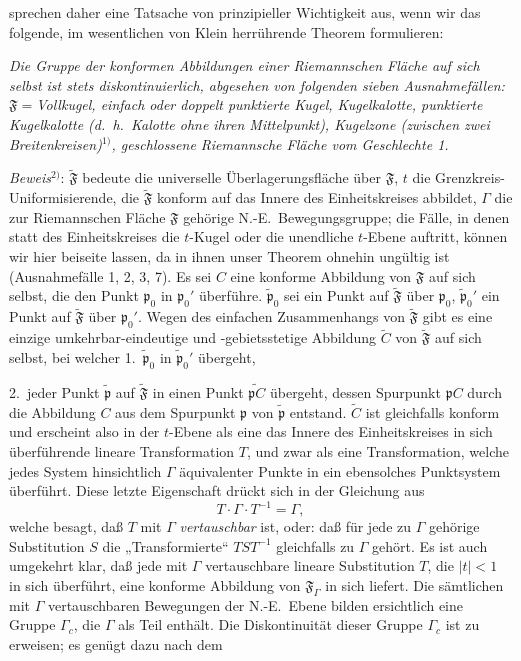 \documentclass{article}
\begin{document}
sprechen daher eine Tatsache von prinzipieller Wichtigkeit aus, wenn wir das folgende, im wesentlichen von Klein herrührende Theorem formulieren:

\emph{Die Gruppe der konformen Abbildungen einer Riemannschen Fläche auf sich selbst ist stets diskontinuierlich, abgesehen von folgenden sieben Ausnahmefällen: $\mathfrak{F} = {}$Vollkugel, einfach oder doppelt punktierte Kugel, Kugelkalotte, punktierte Kugelkalotte (d.~h.\ Kalotte ohne ihren Mittelpunkt), Kugelzone (zwischen zwei Breitenkreisen)${}^{1)}$, geschlossene Riemannsche Fläche vom Geschlechte 1.}

\emph{Beweis}${}^{2)}$: $\widetilde{\mathfrak{F}}$ bedeute die universelle Überlagerungsfläche über $\mathfrak{F}$, $t$ die Grenzkreis-Uniformisierende, die $\widetilde{\mathfrak{F}}$ konform auf das Innere des Einheitskreises abbildet, $\varGamma$ die zur Riemannschen Fläche $\mathfrak{F}$ gehörige N.-E.\ Bewegungsgruppe; die Fälle, in denen statt des Einheitskreises die $t$-Kugel oder die unendliche $t$-Ebene auftritt, können wir hier beiseite lassen, da in ihnen unser Theorem ohnehin ungültig ist (Ausnahmefälle 1, 2, 3, 7). Es sei $C$ eine konforme Abbildung von $\mathfrak{F}$ auf sich selbst, die den Punkt $\mathfrak{p}_0$ in $\mathfrak{p}_0'$ überführe. $\tilde{\mathfrak{p}}_0$ sei ein Punkt auf $\widetilde{\mathfrak{F}}$ über $\mathfrak{p}_0$, $\tilde{\mathfrak{p}}_0'$ ein Punkt auf $\widetilde{\mathfrak{F}}$ über $\mathfrak{p}_0'$. Wegen des einfachen Zusammenhangs von $\widetilde{\mathfrak{F}}$ gibt es eine einzige umkehrbar-eindeutige und -gebietsstetige Abbildung $\widetilde{C}$ von $\widetilde{\mathfrak{F}}$ auf sich selbst, bei welcher
1.~$\tilde{\mathfrak{p}}_0$ in $\tilde{\mathfrak{p}}_0'$ übergeht,

2.~jeder Punkt $\tilde{\mathfrak{p}}$ auf $\widetilde{\mathfrak{F}}$ in einen Punkt $\widetilde{\mathfrak{p}C}$ übergeht, dessen Spurpunkt $\mathfrak{p}C$ durch die Abbildung $C$ aus dem Spurpunkt $\mathfrak{p}$ von $\tilde{\mathfrak{p}}$ entstand.
$\widetilde{C}$ ist gleichfalls konform und erscheint also in der $t$-Ebene als eine das Innere des Einheitskreises in sich überführende lineare Transformation $T$, und zwar als eine Transformation, welche jedes System hinsichtlich $\varGamma$ äquivalenter Punkte in ein ebensolches Punktsystem überführt. Diese letzte Eigenschaft drückt sich in der Gleichung aus
\[ T \cdot \varGamma \cdot T^{-1} = \varGamma, \]
welche besagt, daß $T$ mit $\varGamma$ \emph{vertauschbar} ist, oder: daß für jede zu $\varGamma$ gehörige Substitution $S$ die „Transformierte“ $TST^{-1}$ gleichfalls zu $\varGamma$ gehört. Es ist auch umgekehrt klar, daß jede mit $\varGamma$ vertauschbare lineare Substitution $T$, die $|t| < 1$ in sich überführt, eine konforme Abbildung von $\mathfrak{F}_\varGamma$ in sich liefert. Die sämtlichen mit $\varGamma$ vertauschbaren Bewegungen der N.-E.\ Ebene bilden ersichtlich eine Gruppe $\varGamma_c$, die $\varGamma$ als Teil enthält. Die Diskontinuität dieser Gruppe $\varGamma_c$ ist zu erweisen; es genügt dazu nach dem
\end{document}
